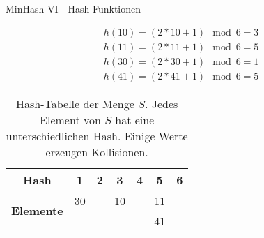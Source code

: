 \begin{frame}{MinHash VI - Hash-Funktionen}
    \begin{example}
        \begin{equation*}
            \begin{split}
                h(10) = (2 * 10 + 1) \mod 6 = 3 \\
                h(11) = (2 * 11 + 1) \mod 6 = 5 \\
                h(30) = (2 * 30 + 1) \mod 6 = 1 \\
                h(41) = (2 * 41 + 1) \mod 6 = 5
            \end{split}
        \end{equation*}
    \end{example}

    \pause
    
    \begin{table}[H]
        \centering
        \begin{tabular}{| c | c | c | c | c | c | c |}
            \hline
            \textbf{Hash} & \textbf{1} & \textbf{2} & \textbf{3} & \textbf{4} & \textbf{5} & \textbf{6}  \\
            \hline
            \multirow{2}{*}{\textbf{Elemente}}   & 30 &    & 10 &    & 11 & \\
            &    &    &    &    & 41  &\\
            \hline
        \end{tabular}    
        \caption{Hash-Tabelle der Menge $ S $. Jedes Element von $ S $ hat eine unterschiedlichen Hash. Einige Werte erzeugen Kollisionen.}
    \end{table} 
\end{frame}